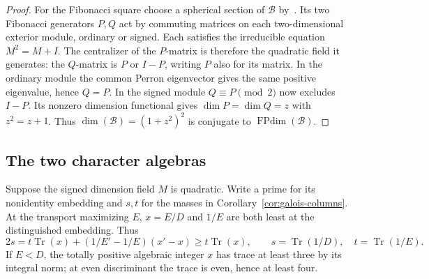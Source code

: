 \documentclass[11pt,reqno]{amsart}
\theoremstyle{remark}\newtheorem{remark}[theorem]{Remark}
\numberwithin{equation}{section}
\begin{document}
\begin{proof}
For the Fibonacci square choose a spherical section of $\mathcal B$
by~\cite[Theorem~12.3]{Rank4Sphere}. Its two Fibonacci generators
$P,Q$ act by commuting matrices on each two-dimensional exterior
module, ordinary or signed. Each satisfies the irreducible equation
$M^2=M+I$. The centralizer of the $P$-matrix is therefore the
quadratic field it generates: the $Q$-matrix is $P$ or $I-P$,
writing $P$ also for its matrix. In the ordinary module the common
Perron eigenvector gives the same positive eigenvalue, hence $Q=P$.
In the signed module $Q\equiv P\pmod2$ now excludes $I-P$.
Its nonzero dimension functional gives $\dim P=\dim Q=z$ with
$z^2=z+1$. Thus $\dim(\mathcal B)=(1+z^2)^2$ is conjugate to
$\operatorname{FPdim}(\mathcal B)$.
\end{proof}

\subsection{The two character algebras}
Suppose the signed dimension field $M$ is quadratic. Write a prime
for its nonidentity embedding and $s,t$ for the masses in
Corollary~\ref{cor:galois-columns}.
At the transport maximizing $E$, $x=E/D$ and $1/E$ are both least
at the distinguished embedding. Thus
\begin{equation}\label{eq:quadratic-trace-order}
       2s=t\operatorname{Tr}(x)+(1/E'-1/E)(x'-x)
          \ge t\operatorname{Tr}(x),
 \qquad s=\operatorname{Tr}(1/D),\quad t=\operatorname{Tr}(1/E).
\end{equation}
If $E<D$, the totally positive algebraic integer $x$ has trace at least three
by its integral norm; at even discriminant the trace is even, hence
at least four.
\end{document}
